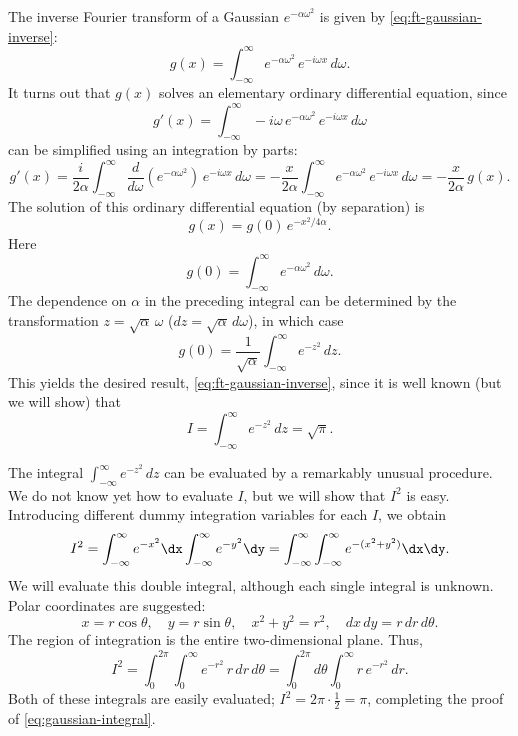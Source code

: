 The inverse Fourier transform of a Gaussian $e^{-\alpha\omega^2}$ is given by \eqref{eq:ft-gaussian-inverse}:
\[
g(x) = \int_{-\infty}^{\infty} e^{-\alpha\omega^2}\,e^{-i\omega x}\,d\omega.
\]
It turns out that $g(x)$ solves an elementary ordinary differential equation, since
\[
g'(x) = \int_{-\infty}^{\infty} -i\omega\,e^{-\alpha\omega^2}\,e^{-i\omega x}\,d\omega
\]
can be simplified using an integration by parts:
\[
g'(x) = \frac{i}{2\alpha}\int_{-\infty}^{\infty} \frac{d}{d \omega}(e^{-\alpha\omega^2})\,e^{-i\omega x}\,d\omega = -\frac{x}{2\alpha}\int_{-\infty}^{\infty} e^{-\alpha\omega^2}\,e^{-i\omega x}\,d\omega = -\frac{x}{2\alpha}\,g(x).
\]
The solution of this ordinary differential equation (by separation) is
\[
g(x) = g(0)\,e^{-x^2/4\alpha}.
\]
Here
\[
g(0) = \int_{-\infty}^{\infty} e^{-\alpha\omega^2}\,d\omega.
\]
The dependence on $\alpha$ in the preceding integral can be determined by the transformation $z = \sqrt{\alpha}\,\omega$ ($dz = \sqrt{\alpha}\,d\omega$), in which case
\[
g(0) = \frac{1}{\sqrt{\alpha}}\int_{-\infty}^{\infty} e^{-z^2}\,dz.
\]
This yields the desired result, \eqref{eq:ft-gaussian-inverse}, since it is well known (but we will show) that
\begin{equation}
\label{eq:gaussian-integral}
I = \int_{-\infty}^{\infty} e^{-z^2}\,dz = \sqrt{\pi}.
\end{equation}

The integral $\int_{-\infty}^{\infty} e^{-z^2}\,dz$ can be evaluated by a remarkably unusual procedure.  We do not know yet how to evaluate $I$, but we will show that $I^2$ is easy.  Introducing different dummy integration variables for each $I$, we obtain
\[
I^2 = \int_{-\infty}^{\infty} e^{-x^2}\dx \int_{-\infty}^{\infty} e^{-y^2}\dy = \int_{-\infty}^{\infty}\int_{-\infty}^{\infty} e^{-(x^2+y^2)}\dx\dy.
\]
We will evaluate this double integral, although each single integral is unknown.  Polar coordinates are suggested:
\[
x = r\cos\theta, \quad y = r\sin\theta, \quad x^2+y^2 = r^2, \quad dx\,dy = r\,dr\,d\theta.
\]
The region of integration is the entire two-dimensional plane.  Thus,
\[
I^2 = \int_0^{2\pi}\int_0^{\infty} e^{-r^2}\,r\,dr\,d\theta = \int_0^{2\pi}d\theta\int_0^{\infty} r\,e^{-r^2}\,dr.
\]
Both of these integrals are easily evaluated; $I^2 = 2\pi \cdot \frac{1}{2} = \pi$, completing the proof of \eqref{eq:gaussian-integral}.

